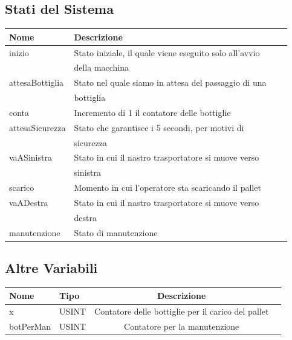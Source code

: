 \documentclass{article}
\begin{document}
\subsection{Stati del Sistema}
\begin{center}
    \begin{tabular}{l l l l }
        \toprule
        \textbf{Nome}   & \textbf{Descrizione}                                   \\
        \midrule
        \midrule
        inizio          & Stato iniziale, il quale viene eseguito solo all'avvio \\
                        & della macchina                                         \\
        \midrule
        attesaBottiglia & Stato nel quale siamo in attesa del passaggio di una   \\
                        & bottiglia                                              \\
        \midrule
        conta           & Incremento di 1 il contatore delle bottiglie         \\
        \midrule
        attesaSicurezza & Stato che garantisce i 5 secondi, per motivi di        \\
                        & sicurezza                                              \\
        \midrule
        vaASinistra     & Stato in cui il nastro trasportatore si muove verso    \\
                        & sinistra                                               \\
        \midrule
        scarico         & Momento in cui l'operatore sta scaricando il pallet    \\
        \midrule
        vaADestra       & Stato in cui il nastro trasportatore si muove verso    \\
                        & destra                                                 \\
        \midrule
        manutenzione    & Stato di manutenzione                                  \\
        \bottomrule
    \end{tabular}
    \label{tab:stati}
\end{center}

\subsection{Altre Variabili}
\begin{center}
    \begin{tabular}{l l c l}
        \toprule
        \textbf{Nome} & \textbf{Tipo} & \textbf{Descrizione}                               \\
        \midrule
        \midrule
        x             & USINT         & Contatore delle bottiglie per il carico del pallet \\
        \midrule
        botPerMan     & USINT         & Contatore per la manutenzione                      \\
        \bottomrule
    \end{tabular}
\end{center}
\end{document}
